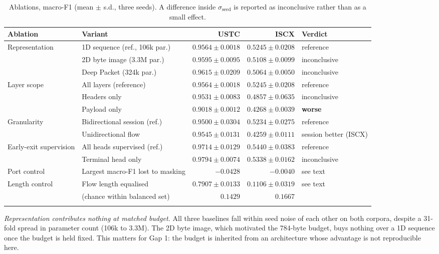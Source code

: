 \documentclass[pdflatex,sn-mathphys-num]{sn-jnl}
\theoremstyle{thmstyleone}%
\theoremstyle{thmstylethree}%
\begin{document}
\begin{table}[tbp]
\caption{Ablations, macro-F1 (mean $\pm$ s.d., three seeds). A difference
inside $\sigma_{\text{seed}}$ is reported as inconclusive rather than as a
small effect.}\label{tab:ablation}
\footnotesize
\begin{tabular}{@{}p{18mm}p{32mm}r r p{18mm}@{}}
\toprule
Ablation & Variant & USTC & ISCX & Verdict \\
\midrule
\multirow{3}{18mm}{Representation}
 & 1D sequence (ref., 106k par.) & $0.9564 \pm 0.0018$ & $0.5245 \pm 0.0208$ & reference \\
 & 2D byte image (3.3M par.) & $0.9595 \pm 0.0095$ & $0.5108 \pm 0.0099$ & inconclusive \\
 & Deep Packet (324k par.) & $0.9615 \pm 0.0209$ & $0.5064 \pm 0.0050$ & inconclusive \\
\midrule
\multirow{3}{18mm}{Layer scope}
 & All layers (reference) & $0.9564 \pm 0.0018$ & $0.5245 \pm 0.0208$ & reference \\
 & Headers only & $0.9531 \pm 0.0083$ & $0.4857 \pm 0.0635$ & inconclusive \\
 & Payload only & $0.9018 \pm 0.0012$ & $0.4268 \pm 0.0039$ & \textbf{worse} \\
\midrule
\multirow{2}{18mm}{Granularity}
 & Bidirectional session (ref.) & $0.9500 \pm 0.0304$ & $0.5234 \pm 0.0275$ & reference \\
 & Unidirectional flow & $0.9545 \pm 0.0131$ & $0.4259 \pm 0.0111$ & session better (ISCX) \\
\midrule
\multirow{2}{18mm}{Early-exit supervision}
 & All heads supervised (ref.) & $0.9714 \pm 0.0129$ & $0.5440 \pm 0.0383$ & reference \\
 & Terminal head only & $0.9794 \pm 0.0074$ & $0.5338 \pm 0.0162$ & inconclusive \\
\midrule
Port control & Largest macro-F1 lost to masking & $-0.0428$ & $-0.0040$ & see text \\
Length control & Flow length equalised & $0.7907 \pm 0.0133$ & $0.1106 \pm 0.0319$ & see text \\
 & (chance within balanced set) & $0.1429$ & $0.1667$ & \\
\botrule
\end{tabular}
\end{table}

\emph{Representation contributes nothing at matched budget.} All three
baselines fall within seed noise of each other on both corpora, despite a
31-fold spread in parameter count (106k to 3.3M). The 2D byte image, which
motivated the 784-byte budget, buys nothing over a 1D sequence once the budget
is held fixed. This matters for Gap 1: the budget is inherited from an
architecture whose advantage is not reproducible here.
\end{document}
